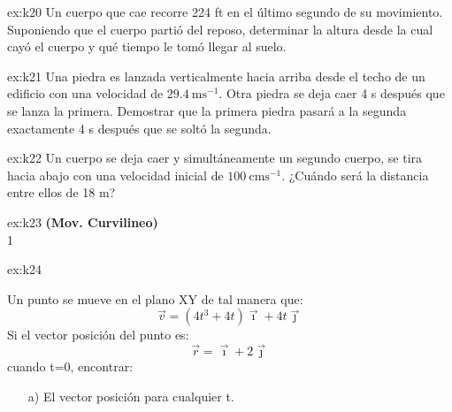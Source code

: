 \begin{multicols}{2}
\begin{excercise}[][][$h=900\ \mathrm{ft}$,  $t=7.5\ \mathrm{s}$]{ex:k20}
{         Un cuerpo que cae recorre 224 ft en el último segundo de su movimiento. Suponiendo que el cuerpo partió del reposo, determinar la altura desde la cual cayó el cuerpo y qué tiempo le tomó llegar al suelo. 
         }
    \end{excercise}
    \begin{excercise}[][][]{ex:k21}{
         Una piedra es lanzada verticalmente hacia arriba desde el techo de un edificio con una velocidad de $29.4 \ \mathrm{ms^{-1}}$. Otra piedra se deja caer 4 s después que se lanza la primera. Demostrar que la primera piedra pasará a la segunda exactamente 4 s después que se soltó la segunda. 
         }
    \end{excercise}
    \begin{excercise}[][][$t=18\ \mathrm{s}$;]{ex:k22}{
         Un cuerpo se deja caer y simultáneamente un segundo cuerpo, se tira hacia abajo con una velocidad inicial de $100 \ \mathrm{cms^{-1}}$. ¿Cuándo será la distancia entre ellos de 18 m?
         }
    \end{excercise}
    \begin{excercise}[][][a) $v=31\ \mathrm{ms^{-1}}$,  $x=19\ \mathrm{m}$; b)  $v=-255\ \mathrm{ms^{-1}}$,  $x=77\ \mathrm{m}$;]{ex:k23}{
        \textbf{(Mov. Curvilineo)}\\ 
        1
        }
    \end{excercise}
    \begin{excercise}[][][a) $\vec{r}=(t^4+2t^2+1)\vec{\imath}+(2t+2)\vec{\jmath}\ \mathrm{m}$, b)  $y^2=4x$;]{ex:k24}{
         Un punto se mueve en el plano XY de tal manera que:
            \begin{equation*}
                \vec{v}=(4t^3+4t)\vec{\imath}+4t\vec{\jmath}
            \end{equation*}
         Si el vector posición del punto es:
            \begin{equation*}
                \vec{r}=\vec{\imath}+2\vec{\jmath}
            \end{equation*}
        cuando t=0, encontrar:
        \begin{itemize}
            \item[a)] El vector posición para cualquier t.

\end{itemize}}
\end{excercise}
\end{multicols}
